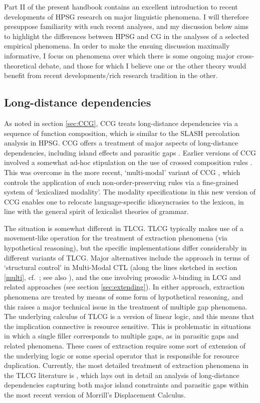 \documentclass[output=paper]{langsci/langscibook}
\begin{document}
Part II of the present handbook contains an excellent introduction to
recent developments of HPSG research on major linguistic phenomena. I
will therefore presuppose familiarity with such recent analyses, and my discussion below aims to highlight the
differences between HPSG and CG in the analyses of a selected
empirical phenomena. In order to make the ensuing discussion maximally
informative, I focus on phenomena over which there is some ongoing
major cross-theoretical debate, and those for which I believe one or
the other theory would benefit from recent developments/rich research
tradition in the other.


\subsection{Long-distance dependencies}

As noted in section \ref{sec:CCG}, CCG treats long-distance
dependencies via a sequence of function composition, which is similar
to the SLASH percolation analysis in HPSG. CCG offers a treatment of
major aspects of long-distance dependencies, including island effects
\citep{Steedman2000a-u} and parasitic gaps \citep{Steedman87a-u}.
Earlier versions of CCG involved a somewhat ad-hoc stipulation on the
use of crossed composition rules \citep{Steedman97a}. This was
overcome in the more recent, `multi-modal' variant of CCG
\citep{Baldridge2002a-u}, which controls the application of such
non-order-preserving rules via a fine-grained system of `lexicalized
modality'. The modality specifications in this new version of CCG
enables one to relocate language-specific idiosyncrasies to the
lexicon, in line with the general spirit of lexicalist theories of
grammar.

The situation is somewhat different in TLCG. TLCG typically makes use
of a movement-like operation for the treatment of extraction
phenomena (via hypothetical reasoning), but the specific implementations differ considerably in
different variants of TLCG. Major alternatives include the approach in
terms of   `structural control' in Multi-Modal CTL (along the lines
sketched in section \ref{multi}, cf.~\citet{bernardiphd,Moortgat2011a-u};
see also \citet{Morrill94a-u}), and the one involving prosodic
$\lambda$-binding in LCG and related approaches (see section
\ref{sec:extending}). In either approach, extraction phenomena are
treated by means of some form of hypothetical reasoning, and this
raises a major technical issue in the treatment of multiple gap
phenomena. The underlying calculus of TLCG is a version of linear
logic, and this means that the implication connective is resource
sensitive. This is problematic in situations in which a single filler
corresponds to multiple gaps, as in parasitic gaps and related
phenomena. These cases of extraction require some sort of extension of
the underlying logic or some special operator that is responsible for
resource duplication. Currently, the most detailed treatment of
extraction phenomena in the TLCG literature is \citet{morrilllp},
which lays out in detail an analysis of long-distance dependencies
capturing both major island constraints and parasitic gaps within the
most recent version of Morrill's Displacement Calculus.
\end{document}
